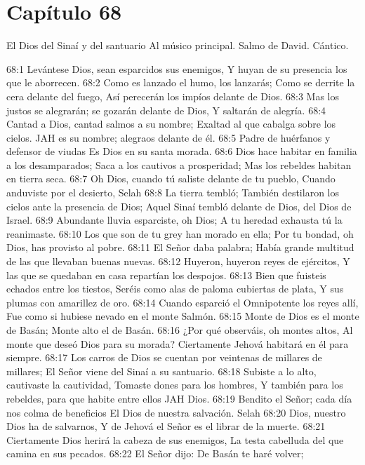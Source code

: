 \section*{Capítulo 68}
El Dios del Sinaí y del santuario 
Al músico principal. Salmo de David. Cántico. 
 
68:1 Levántese Dios, sean esparcidos sus enemigos, 
Y huyan de su presencia los que le aborrecen. 
68:2 Como es lanzado el humo, los lanzarás; 
Como se derrite la cera delante del fuego, 
Así perecerán los impíos delante de Dios. 
68:3 Mas los justos se alegrarán; se gozarán delante de Dios, 
Y saltarán de alegría. 
68:4 Cantad a Dios, cantad salmos a su nombre; 
Exaltad al que cabalga sobre los cielos. 
JAH es su nombre; alegraos delante de él. 
68:5 Padre de huérfanos y defensor de viudas 
Es Dios en su santa morada. 
68:6 Dios hace habitar en familia a los desamparados; 
Saca a los cautivos a prosperidad; 
Mas los rebeldes habitan en tierra seca. 
68:7 Oh Dios, cuando tú saliste delante de tu pueblo, 
Cuando anduviste por el desierto, Selah 
68:8 La tierra tembló; 
También destilaron los cielos ante la presencia de Dios; 
Aquel Sinaí tembló delante de Dios, del Dios de Israel. 
68:9 Abundante lluvia esparciste, oh Dios; 
A tu heredad exhausta tú la reanimaste. 
68:10 Los que son de tu grey han morado en ella; 
Por tu bondad, oh Dios, has provisto al pobre. 
68:11 El Señor daba palabra; 
Había grande multitud de las que llevaban buenas nuevas. 
68:12 Huyeron, huyeron reyes de ejércitos, 
Y las que se quedaban en casa repartían los despojos. 
68:13 Bien que fuisteis echados entre los tiestos, 
Seréis como alas de paloma cubiertas de plata, 
Y sus plumas con amarillez de oro. 
68:14 Cuando esparció el Omnipotente los reyes allí, 
Fue como si hubiese nevado en el monte Salmón. 
68:15 Monte de Dios es el monte de Basán; 
Monte alto el de Basán. 
68:16 ¿Por qué observáis, oh montes altos, 
Al monte que deseó Dios para su morada? 
Ciertamente Jehová habitará en él para siempre. 
68:17 Los carros de Dios se cuentan por veintenas de millares de millares; 
El Señor viene del Sinaí a su santuario. 
68:18 Subiste a lo alto, cautivaste la cautividad, 
Tomaste dones para los hombres, 
Y también para los rebeldes, para que habite entre ellos JAH Dios. 
68:19 Bendito el Señor; cada día nos colma de beneficios 
El Dios de nuestra salvación. Selah 
68:20 Dios, nuestro Dios ha de salvarnos, 
Y de Jehová el Señor es el librar de la muerte. 
68:21 Ciertamente Dios herirá la cabeza de sus enemigos, 
La testa cabelluda del que camina en sus pecados. 
68:22 El Señor dijo: De Basán te haré volver; 
